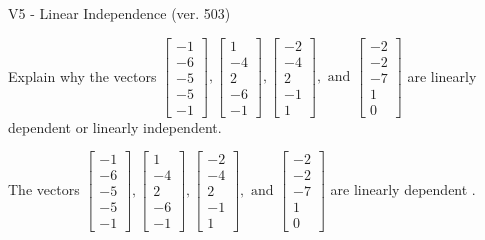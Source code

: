 \begin{exercise}
  \begin{exerciseTitle}V5 - Linear Independence (ver. 503)\end{exerciseTitle}
  \begin{exerciseStatement}
    Explain why the vectors \(\left[\begin{array}{r}
-1 \\
-6 \\
-5 \\
-5 \\
-1
\end{array}\right] , \left[\begin{array}{r}
1 \\
-4 \\
2 \\
-6 \\
-1
\end{array}\right] , \left[\begin{array}{r}
-2 \\
-4 \\
2 \\
-1 \\
1
\end{array}\right] , \text{ and } \left[\begin{array}{r}
-2 \\
-2 \\
-7 \\
1 \\
0
\end{array}\right]\) are linearly dependent or linearly independent.	


  \end{exerciseStatement}
  \begin{exerciseAnswer}
   The vectors \(\left[\begin{array}{r}
-1 \\
-6 \\
-5 \\
-5 \\
-1
\end{array}\right] , \left[\begin{array}{r}
1 \\
-4 \\
2 \\
-6 \\
-1
\end{array}\right] , \left[\begin{array}{r}
-2 \\
-4 \\
2 \\
-1 \\
1
\end{array}\right] , \text{ and } \left[\begin{array}{r}
-2 \\
-2 \\
-7 \\
1 \\
0
\end{array}\right]\) are 
  	 linearly dependent  .
  


  \end{exerciseAnswer}
\end{exercise}